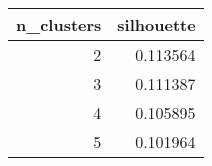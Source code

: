 \begin{tabular}{rr}
\toprule
 n\_clusters &  silhouette \\
\midrule
          2 &    0.113564 \\
          3 &    0.111387 \\
          4 &    0.105895 \\
          5 &    0.101964 \\
\bottomrule
\end{tabular}

